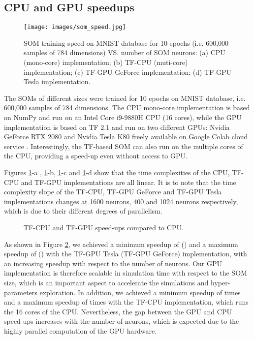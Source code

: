 \documentclass[runningheads]{llncs}
\begin{document}
\subsection{CPU and GPU speedups}

\begin{figure}[ht]
	\centerline{\texttt{[image: images/som\_speed.jpg]}}
	\caption{SOM training speed on MNIST database for 10 epochs (i.e. 600,000 samples of 784 dimensions) VS. number of SOM neurons: (a) CPU (mono-core) implementation; (b) TF-CPU (muti-core) implementation; (c) TF-GPU GeForce implementation; (d) TF-GPU Tesla implementation.}
	\label{fig_som-speed}
\end{figure}

The SOMs of different sizes were trained for 10 epochs on MNIST database, i.e. 600,000 samples of 784 dimensions. The CPU mono-core implementation is based on NumPy \cite{vanderwalt2011numpy} and run on an Intel Core i9-9880H CPU (16 cores), while the GPU implementation is based on TF 2.1 \cite{abadi2016tensorflow} and run on two different GPUs: Nvidia GeForce RTX 2080 and Nvidia Tesla K80 freely available on Google Colab cloud service \cite{carneiro2018colab}. Interestingly, the TF-based SOM can also run on the multiple cores of the CPU, providing a speed-up even without access to GPU.

Figures \ref{fig_som-speed}-a , \ref{fig_som-speed}-b, \ref{fig_som-speed}-c and \ref{fig_som-speed}-d show that the time complexities of the CPU, TF-CPU and TF-GPU implementations are all linear. It is to note that the time complexity slope of the TF-CPU, TF-GPU GeForce and TF-GPU Tesla implementations changes at 1600 neurons, 400 and 1024 neurons respectively, which is due to their different degrees of parallelism.

\begin{figure}[ht]
	\centerline{}
	\caption{TF-CPU and TF-GPU speed-ups compared to CPU.}
	\label{fig_som-speedup}
\end{figure}

As shown in Figure \ref{fig_som-speedup}, we achieved a minimum speedup of  () and a maximum speedup of  () with the TF-GPU Tesla (TF-GPU GeForce) implementation, with an increasing speedup with respect to the number of neurons. Our GPU implementation is therefore scalable in simulation time with respect to the SOM size, which is an important aspect to accelerate the simulations and hyper-parameters exploration. 
In addition, we achieved a minimum speedup of  times and a maximum speedup of  times with the TF-CPU implementation, which runs the 16 cores of the CPU. Nevertheless, the gap between the GPU and CPU speed-ups increases with the number of neurons, which is expected due to the highly parallel computation of the GPU hardware.
\end{document}
